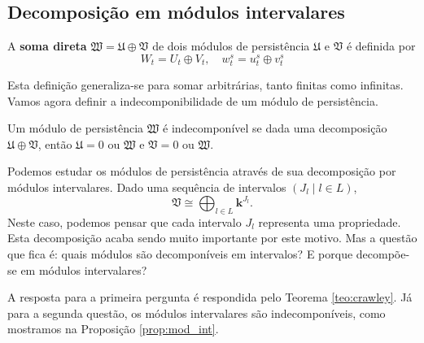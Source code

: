 \subsection{Decomposição em módulos intervalares} 

\begin{defi}
    A \textbf{soma direta} $\mathfrak{W} = \mathfrak{U} \oplus \mathfrak{V}$ de dois módulos
    de persistência $\mathfrak{U}$ e $\mathfrak{V}$ é definida por
    \begin{equation*}
        W_t = U_t \oplus V_t, \quad w^s_t = u_t^s \oplus v^s_t
    \end{equation*}
\end{defi}
Esta definição generaliza-se para somar arbitrárias, tanto finitas como infinitas. Vamos agora definir
a indecomponibilidade de um módulo de persistência.

\begin{defi}
    Um módulo de persistência $\mathfrak{W}$ é indecomponível se dada uma decomposição $\mathfrak{U}
    \oplus \mathfrak{V}$, então $\mathfrak{U} = 0$ ou $\mathfrak{W}$ e $\mathfrak{V} = 0$ ou $
        \mathfrak{W}$.
\end{defi}

Podemos estudar os módulos de persistência através de sua decomposição por módulos intervalares. Dado
uma sequência de intervalos $(J_l \mid l \in L)$,
\begin{equation*}
    \mathfrak{V} \cong \bigoplus_{l \in L} \mathbf{k}^{J_l}.
\end{equation*}
Neste caso, podemos pensar que cada intervalo $J_l$ representa uma propriedade. Esta decomposição acaba
sendo muito importante por este motivo. Mas a questão que fica é: quais módulos são decomponíveis em 
intervalos? E porque decompõe-se em módulos intervalares? 

A resposta para a primeira pergunta é respondida pelo Teorema \ref{teo:crawley}. Já para a segunda questão,
os módulos intervalares são indecomponíveis, como mostramos na Proposição \ref{prop:mod_int}.

